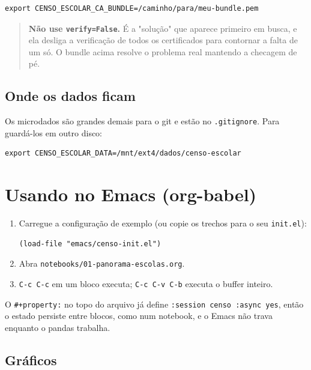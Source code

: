 \documentclass[11pt]{article}
\begin{document}
\begin{verbatim}
export CENSO_ESCOLAR_CA_BUNDLE=/caminho/para/meu-bundle.pem
\end{verbatim}

\begin{quote}
\textbf{Não use \texttt{verify=False}.} É a "solução" que aparece primeiro em busca, e ela
desliga a verificação de todos os certificados para contornar a falta de um só.
O bundle acima resolve o problema real mantendo a checagem de pé.
\end{quote}
\subsection*{Onde os dados ficam}
\label{sec:orgbeb35e0}

Os microdados são grandes demais para o git e estão no \texttt{.gitignore}. Para
guardá-los em outro disco:

\begin{verbatim}
export CENSO_ESCOLAR_DATA=/mnt/ext4/dados/censo-escolar
\end{verbatim}
\section*{Usando no Emacs (org-babel)}
\label{sec:orgb1647bf}

\begin{enumerate}
\item Carregue a configuração de exemplo (ou copie os trechos para o seu
\texttt{init.el}):

\begin{verbatim}
(load-file "emacs/censo-init.el")
\end{verbatim}

\item Abra \texttt{notebooks/01-panorama-escolas.org}.

\item \texttt{C-c C-c} em um bloco executa; \texttt{C-c C-v C-b} executa o buffer inteiro.
\end{enumerate}

O \texttt{\#+property:} no topo do arquivo já define \texttt{:session censo :async yes}, então
o estado persiste entre blocos, como num notebook, e o Emacs não trava enquanto
o pandas trabalha.
\subsection*{Gráficos}
\label{sec:org7cac987}
\end{document}
